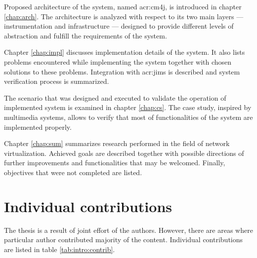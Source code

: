 \documentclass[11pt,openany]{book}
\begin{document}
      Proposed architecture of the system, named \gls{acr:cm4j}, is introduced in chapter \ref{chap:arch}. The
      architecture is analyzed with respect to its two main layers --- instrumentation and infrastructure --- designed
      to provide different levels of abstraction and fulfill the requirements of the system.

      Chapter \ref{chap:impl} discusses implementation details of the system. It also lists problems encountered while
      implementing the system together with chosen solutions to these problems. Integration with \gls{acr:jims} is
      described and system verification process is summarized.

      The scenario that was designed and executed to validate the operation of implemented system is examined in chapter
      \ref{chap:cs}. The case study, inspired by multimedia systems, allows to verify that most of functionalities of
      the system are implemented properly.

      Chapter \ref{chap:sum} summarizes research performed in the field of network virtualization. Achieved goals are
      described together with possible directions of further improvements and functionalities that may be welcomed.
      Finally, objectives that were not completed are listed.
      

    \section{Individual contributions}

      The thesis is a result of joint effort of the authors. However, there are areas where particular author
      contributed majority of the content. Individual contributions are listed in table \ref{tab:intro:contrib}.

      \newcommand{\compref}[1]{\ref{#1} \nameref{#1}}
\end{document}
